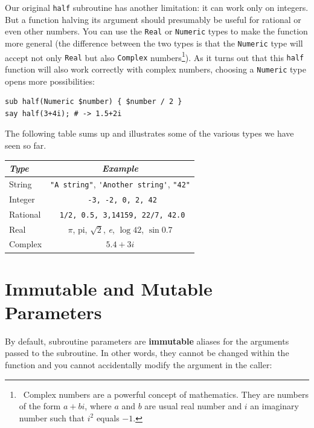 Our original {\tt half} subroutine has another limitation: it
can work only on integers. But a function halving its argument 
should presumably be useful for rational or even other numbers. 
You can use the {\tt Real} or {\tt Numeric} types to make 
the function more general (the difference between the two 
types is that the {\tt Numeric} type will accept not only 
{\tt Real} but also {\tt Complex} numbers\footnote{~Complex 
numbers are a powerful concept of mathematics. They are numbers 
of the form $a + bi$, where $a$ and $b$ are usual real number and 
$i$ an imaginary number such that $i^2$ equals $-1$.}). As it turns out 
that this {\tt half} function will also work correctly 
with complex numbers, choosing a {\tt Numeric} 
type opens more possibilities:

\begin{verbatim}
sub half(Numeric $number) { $number / 2 }
say half(3+4i); # -> 1.5+2i
\end{verbatim}

The following table sums up and illustrates some of the 
various types we have seen so far.

\begin{center}
\begin{tabular}{|l|c|}  \hline
\label{types}
\emph{Type} & \emph{Example}   \\ \hline
String      & \verb'"A string"', \verb"'Another string'", \verb'"42"' \\ \hline
Integer     & \verb' -3, -2, 0, 2, 42' \\ \hline
Rational    & \verb' 1/2, 0.5, 3,14159, 22/7, 42.0' \\ \hline
Real        & $\pi$, pi, $\surd{2}$, \emph{e}, $\log 42$, $\sin 0.7$\\ \hline
Complex     & $5.4 + 3i$ \\ \hline
\end{tabular}
\end{center}


\section{Immutable and Mutable Parameters}

By default, subroutine parameters are {\bf immutable} aliases for 
the arguments passed to the subroutine. In other words, they 
cannot be changed within the function and you cannot 
accidentally modify the argument in the caller:

